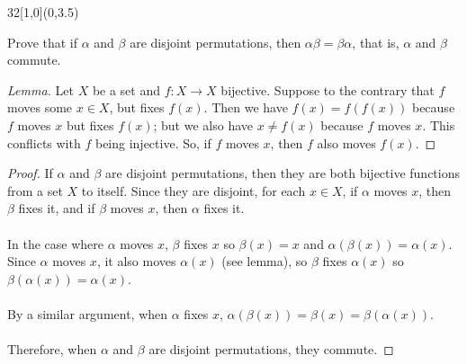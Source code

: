 \documentclass[12pt]{article}
\newenvironment{exercise}[2]{\begin{textblock}{32}[1,0](0,#2)\noindent#1\end{textblock}}{\vspace{1in}}
\begin{document}
\begin{exercise}{1.8}{3.5}
	{\noindent}Prove that if $\alpha$ and $\beta$ are disjoint permutations, then $\alpha\beta=\beta\alpha$, that is, $\alpha$ and $\beta$ commute.
	\bigskip

	\begin{proof}[Lemma]
		Let $X$ be a set and $f:X\to X$ bijective. Suppose to the contrary that $f$ moves some $x\in X$, but fixes $f(x)$. Then we have $f(x) = f(f(x))$ because $f$ moves $x$ but fixes $f(x)$; but we also have $x\neq f(x)$ because $f$ moves $x$. This conflicts with $f$ being injective.
		So, if $f$ moves $x$, then $f$ also moves $f(x)$.
	\end{proof}
	\bigskip

	\begin{proof}
		If $\alpha$ and $\beta$ are disjoint permutations, then they are both bijective functions from a set $X$ to itself. Since they are disjoint, for each $x\in X$, if $\alpha$ moves $x$, then $\beta$ fixes it, and if $\beta$ moves $x$, then $\alpha$ fixes it.\\
		\\
		In the case where $\alpha$ moves $x$, $\beta$ fixes $x$ so $\beta(x) = x$ and $\alpha(\beta(x)) = \alpha(x)$.\\
		Since $\alpha$ moves $x$, it also moves $\alpha(x)$ (see lemma), so $\beta$ fixes $\alpha(x)$ so $\beta(\alpha(x)) = \alpha(x)$.\\
		\\
		By a similar argument, when $\alpha$ fixes $x$, $\alpha(\beta(x)) = \beta(x) = \beta(\alpha(x))$.\\
		\\
		Therefore, when $\alpha$ and $\beta$ are disjoint permutations, they commute.
	\end{proof}
\end{exercise}

\newpage
\end{document}
